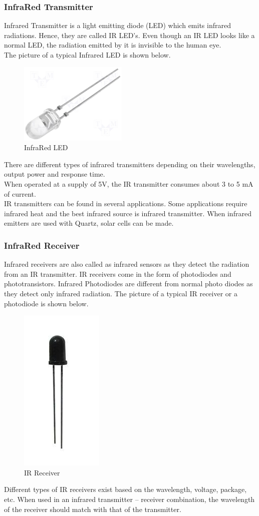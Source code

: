 \subsubsection{InfraRed Transmitter}
Infrared Transmitter is a light emitting diode (LED) which emits infrared radiations. Hence, they are called IR LED’s. Even though an IR LED looks like a normal LED, the radiation emitted by it is invisible to the human eye.\\
The picture of a typical Infrared LED is shown below.
\begin{figure}[h]
\center
\includegraphics[scale=.5]{IR2.PNG} 
\caption{InfraRed LED }
\end{figure}
\justify There are different types of infrared transmitters depending on their wavelengths, output power and response time.\\
When operated at a supply of 5V, the IR transmitter consumes about 3 to 5 mA of current. \\
IR transmitters can be found in several applications. Some applications require infrared heat and the best infrared source is infrared transmitter. When infrared emitters are used with Quartz, solar cells can be made.
\subsubsection{InfraRed Receiver}
Infrared receivers are also called as infrared sensors as they detect the radiation from an IR transmitter. IR receivers come in the form of photodiodes and phototransistors. Infrared Photodiodes are different from normal photo diodes as they detect only infrared radiation. The picture of a typical IR receiver or a photodiode is shown below.
\begin{figure}[h]
\center
\includegraphics[scale=0.5]{IRR.jpg} 
\caption{IR Receiver }
\end{figure}
\justify Different types of IR receivers exist based on the wavelength, voltage, package, etc. When used in an infrared transmitter – receiver combination, the wavelength of the receiver should match with that of the transmitter.
